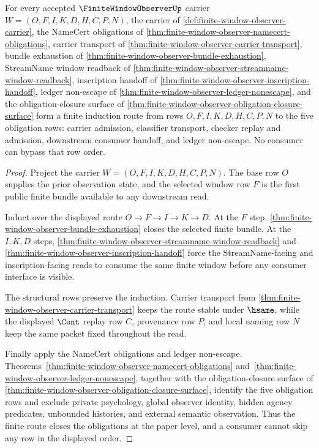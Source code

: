 \begin{theorem}
\label{thm:finite-window-observer-obligation-closure-route}
For every accepted $\FiniteWindowObserverUp$ carrier $W=(O,F,I,K,D,H,C,P,N)$, the carrier of \autoref{def:finite-window-observer-carrier}, the NameCert obligations of \autoref{thm:finite-window-observer-namecert-obligations}, carrier transport of \autoref{thm:finite-window-observer-carrier-transport}, bundle exhaustion of \autoref{thm:finite-window-observer-bundle-exhaustion}, StreamName window readback of \autoref{thm:finite-window-observer-streamname-window-readback}, inscription handoff of \autoref{thm:finite-window-observer-inscription-handoff}, ledger non-escape of \autoref{thm:finite-window-observer-ledger-nonescape}, and the obligation-closure surface of \autoref{thm:finite-window-observer-obligation-closure-surface} form a finite induction route from rows $O,F,I,K,D,H,C,P,N$ to the five obligation rows: carrier admission, classifier transport, checker replay and admission, downstream consumer handoff, and ledger non-escape. No consumer can bypass that row order.
\end{theorem}
\begin{proof}
Project the carrier $W=(O,F,I,K,D,H,C,P,N)$. The base row $O$ supplies the prior observation state, and the selected window row $F$ is the first public finite bundle available to any downstream read.

Induct over the displayed route $O \to F \to I \to K \to D$. At the $F$ step, \autoref{thm:finite-window-observer-bundle-exhaustion} closes the selected finite bundle. At the $I,K,D$ steps, \autoref{thm:finite-window-observer-streamname-window-readback} and \autoref{thm:finite-window-observer-inscription-handoff} force the StreamName-facing and inscription-facing reads to consume the same finite window before any consumer interface is visible.

The structural rows preserve the induction. Carrier transport from \autoref{thm:finite-window-observer-carrier-transport} keeps the route stable under $\hsame$, while the displayed $\Cont$ replay row $C$, provenance row $P$, and local naming row $N$ keep the same packet fixed throughout the read.

Finally apply the NameCert obligations and ledger non-escape. Theorems~\ref{thm:finite-window-observer-namecert-obligations} and~\ref{thm:finite-window-observer-ledger-nonescape}, together with the obligation-closure surface of \autoref{thm:finite-window-observer-obligation-closure-surface}, identify the five obligation rows and exclude private psychology, global observer identity, hidden agency predicates, unbounded histories, and external semantic observation. Thus the finite route closes the obligations at the paper level, and a consumer cannot skip any row in the displayed order.
\end{proof}


